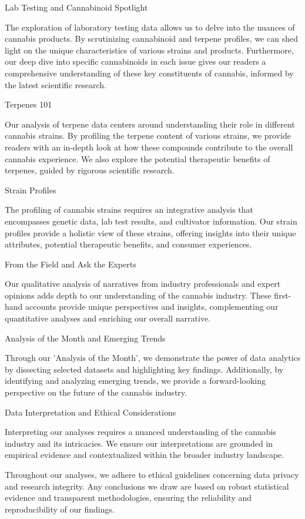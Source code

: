 \documentclass[../article.tex, 12pt]{subfiles}
\begin{document}
\begin{multicols*}{2}
Lab Testing and Cannabinoid Spotlight

The exploration of laboratory testing data allows us to delve into the nuances of cannabis products. By scrutinizing cannabinoid and terpene profiles, we can shed light on the unique characteristics of various strains and products. Furthermore, our deep dive into specific cannabinoids in each issue gives our readers a comprehensive understanding of these key constituents of cannabis, informed by the latest scientific research.

Terpenes 101

Our analysis of terpene data centers around understanding their role in different cannabis strains. By profiling the terpene content of various strains, we provide readers with an in-depth look at how these compounds contribute to the overall cannabis experience. We also explore the potential therapeutic benefits of terpenes, guided by rigorous scientific research.

Strain Profiles

The profiling of cannabis strains requires an integrative analysis that encompasses genetic data, lab test results, and cultivator information. Our strain profiles provide a holistic view of these strains, offering insights into their unique attributes, potential therapeutic benefits, and consumer experiences.

From the Field and Ask the Experts

Our qualitative analysis of narratives from industry professionals and expert opinions adds depth to our understanding of the cannabis industry. These first-hand accounts provide unique perspectives and insights, complementing our quantitative analyses and enriching our overall narrative.

Analysis of the Month and Emerging Trends

Through our 'Analysis of the Month', we demonstrate the power of data analytics by dissecting selected datasets and highlighting key findings. Additionally, by identifying and analyzing emerging trends, we provide a forward-looking perspective on the future of the cannabis industry.

Data Interpretation and Ethical Considerations

Interpreting our analyses requires a nuanced understanding of the cannabis industry and its intricacies. We ensure our interpretations are grounded in empirical evidence and contextualized within the broader industry landscape.

Throughout our analyses, we adhere to ethical guidelines concerning data privacy and research integrity. Any conclusions we draw are based on robust statistical evidence and transparent methodologies, ensuring the reliability and reproducibility of our findings.


\end{multicols*}
\end{document}
